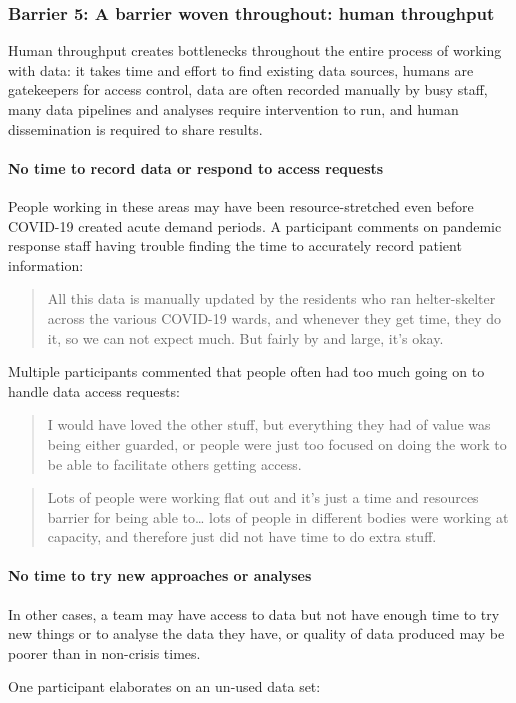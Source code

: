 \documentclass{CUP-JNL-DAP}%
\begin{document}
\subsubsection{Barrier 5: A barrier woven throughout: human throughput}

Human throughput creates bottlenecks throughout the entire process of working with data: it takes time and effort to find existing data sources, humans are gatekeepers for access control, data are often recorded manually by busy staff, many data pipelines and analyses require intervention to run, and human dissemination is required to share results. 

\paragraph{No time to record data or respond to access requests}
People working in these areas may have been resource-stretched even before COVID-19 created acute demand periods. A participant comments on pandemic response staff having trouble finding the time to accurately record patient information: 

\blockquote{All this data is manually updated by the residents who ran helter-skelter across the various COVID-19 wards, and whenever they get time, they do it, so we can not expect much. But fairly by and large, it's okay.}

Multiple participants commented that people often had too much going on to handle data access requests: 

\blockquote{I would have loved the other stuff, but everything they had of value was being either guarded, or people were just too focused on doing the work to be able to facilitate others getting access.}

\blockquote{Lots of people were working flat out and it's just a time and resources barrier for being able to… lots of people in different bodies were working at capacity, and therefore just did not have time to do extra stuff.}

\paragraph{No time to try new approaches or analyses}
In other cases, a team may have access to data but not have enough time to try new things or to analyse the data they have, or quality of data produced may be poorer than in non-crisis times.

One participant elaborates on an un-used data set: 
\end{document}
